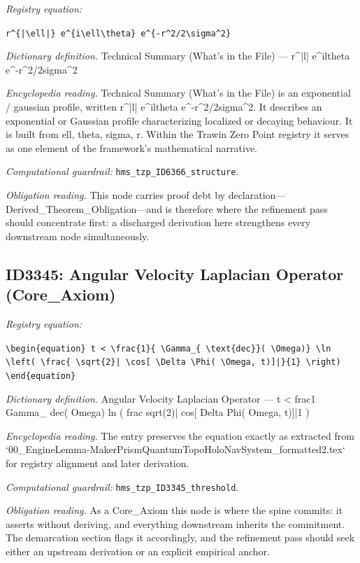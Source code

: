 \documentclass[11pt]{article}
\theoremstyle{remark}
\begin{document}
\noindent\textit{Registry equation:}\par
{\small\texttt{r\textasciicircum{}\{|\textbackslash{}ell|\} e\textasciicircum{}\{i\textbackslash{}ell\textbackslash{}theta\} e\textasciicircum{}\{-r\textasciicircum{}2/2\textbackslash{}sigma\textasciicircum{}2\}}}\par\medskip
\noindent\textit{Dictionary definition.} Technical Summary (What's in the File) --- r\textasciicircum{}|l| e\textasciicircum{}iltheta e\textasciicircum{}-r\textasciicircum{}2/2sigma\textasciicircum{}2\par\medskip
\noindent\textit{Encyclopedia reading.} Technical Summary (What's in the File) is an exponential / gaussian profile, written r\textasciicircum{}|l| e\textasciicircum{}iltheta e\textasciicircum{}-r\textasciicircum{}2/2sigma\textasciicircum{}2. It describes an exponential or Gaussian profile characterizing localized or decaying behaviour. It is built from ell, theta, sigma, r. Within the Trawin Zero Point registry it serves as one element of the framework's mathematical narrative.
\par\medskip\noindent\textit{Computational guardrail:} \texttt{hms\_tzp\_ID6366\_structure}.
\par\medskip\noindent\textit{Obligation reading.} This node carries proof debt by declaration---Derived\_Theorem\_Obligation---and is therefore where the refinement pass should concentrate first: a discharged derivation here strengthens every downstream node simultaneously.

\subsection{ID3345: Angular Velocity Laplacian Operator (Core\_Axiom)}

\noindent\textit{Registry equation:}\par
{\small\texttt{\textbackslash{}begin\{equation\} t < \textbackslash{}frac\{1\}\{ \textbackslash{}Gamma\_\{ \textbackslash{}text\{dec\}\}( \textbackslash{}Omega)\} \textbackslash{}ln \textbackslash{}left( \textbackslash{}frac\{ \textbackslash{}sqrt\{2\}| \textbackslash{}cos[ \textbackslash{}Delta \textbackslash{}Phi( \textbackslash{}Omega, t)]|\}\{1\} \textbackslash{}right) \textbackslash{}end\{equation\}}}\par\medskip
\noindent\textit{Dictionary definition.} Angular Velocity Laplacian Operator --- t < frac1 Gamma\_ dec( Omega) ln ( frac sqrt(2)| cos[ Delta Phi( Omega, t)]|1 )\par\medskip
\noindent\textit{Encyclopedia reading.} The entry preserves the equation exactly as extracted from `00\_EngineLemma-MakerPrismQuantumTopoHoloNavSystem\_formatted2.tex` for registry alignment and later derivation.
\par\medskip\noindent\textit{Computational guardrail:} \texttt{hms\_tzp\_ID3345\_threshold}.
\par\medskip\noindent\textit{Obligation reading.} As a Core\_Axiom this node is where the spine commits: it asserts without deriving, and everything downstream inherits the commitment. The demarcation section flags it accordingly, and the refinement pass should seek either an upstream derivation or an explicit empirical anchor.
\end{document}
